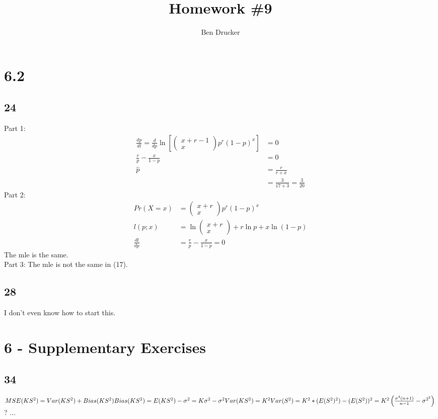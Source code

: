 \documentclass{article}
\newcommand{\hwkNum}{9}
\newcommand{\hwkAuthors}{Ben Drucker}
\begin{document}
\title{Homework \#\hwkNum}
\author{\hwkAuthors}
\date{}

\maketitle


\section*{6.2}
	\subsection*{24}
		Part 1:
		\begin{align*} 
			\frac{dp}{dl} = \frac{d}{dp} \ln \left [ \left ( \begin{array} {c} x+r-1 \\ x \end{array} \right ) p^r (1-p)^x \right ] &= 0 \\
			\frac{r}{p}- \frac{x}{1-p} &= 0 \\
			\hat{p} &= \frac{r}{r+x} \\
			&= \frac{3}{17+3} = \frac{3}{20}
		\end{align*}
		Part 2:
			\begin{align*}
				Pr(X=x) &= \left ( \begin{array}{c} x+r \\ x \end{array} \right ) p^r (1-p)^x \\
				l(p;x) &= \ln \left ( \begin{array}{c} x+r \\ x \end{array} \right ) + r \ln p + x\ln (1-p) \\
				\frac{dl}{dp} &= \frac{r}{p} - \frac{x}{1-p} = 0
			\end{align*}
			The mle is the same. \\
		Part 3: The mle is not the same in (17). 
	\subsection*{28}
		I don't even know how to start this. 
		
\section*{6 - Supplementary Exercises}
	\subsection*{34}
		$MSE(KS^2) = Var(KS^2) + Bias(KS^2) \\
		Bias(KS^2) = E(KS^2) - \sigma^2 = K\sigma^2 - \sigma^2\\
		Var(KS^2) = K^2Var(S^2) = K^2 * (E(S^2)^2) - (E(S^2))^2 = K^2 \left ( 
		\frac{\sigma^4(n+1)}{n-1} - \sigma^{2^2} \right ) \\$
		? ...
\end{document}
